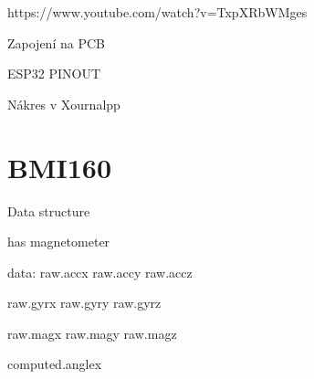 https://www.youtube.com/watch?v=TxpXRbWMges

Zapojení na PCB

ESP32 PINOUT


Nákres v Xournalpp




\section{BMI160}

 Data structure

 has magnetometer

 data:
    raw.accx
    raw.accy
    raw.accz

    raw.gyrx
    raw.gyry
    raw.gyrz

    raw.magx
    raw.magy
    raw.magz

    computed.anglex

